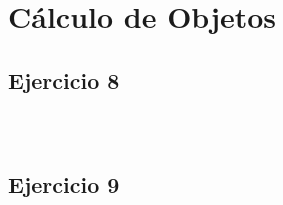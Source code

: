 \documentclass[10pt,a4paper]{article}
\begin{document}
\subsubsection{}
    \begin{lstlisting}
    \end{lstlisting}
\subsubsection{}
    \begin{lstlisting}
    \end{lstlisting}

\section*{\centering Cálculo de Objetos}

\subsection{Ejercicio 8}
\subsubsection{}
    \begin{lstlisting}
    \end{lstlisting}
\subsubsection{}
    \begin{lstlisting}
    \end{lstlisting}
\subsection{Ejercicio 9}
\subsubsection{}
    \begin{lstlisting}
    \end{lstlisting}
\subsubsection{}
    \begin{lstlisting}
    \end{lstlisting}
\subsubsection{}
    \begin{lstlisting}
    \end{lstlisting}
\end{document}
